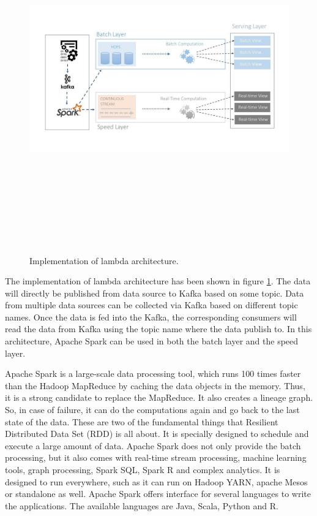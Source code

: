 \begin{figure}[htpb]
	\centering
	\includegraphics[width=17cm,height=15cm,keepaspectratio=true]{images/imp_lambda_arc}
	\caption{
		Implementation of lambda architecture.
	}
	\label{fig:impl_lambda_arc}
\end{figure}


The implementation of lambda architecture has been shown in figure \ref{fig:impl_lambda_arc}. The data will directly be published from data source to Kafka based on some topic. Data from multiple data sources can be collected via Kafka based on different topic names. Once the data is fed into the Kafka, the corresponding consumers will read the data from Kafka using the topic name where the data publish to. In this architecture, Apache Spark can be used in both the batch layer and the speed layer. 

Apache Spark is a large-scale data processing tool, which runs 100 times faster than the Hadoop MapReduce by caching the data objects in the memory. Thus, it is a strong candidate to replace the MapReduce. It also creates a lineage graph. So, in case of failure, it can do the computations again and go back to the last state of the data. These are two of the fundamental things that Resilient Distributed Data Set (RDD) is all about. It is specially designed to schedule and execute a large amount of data. Apache Spark does not only provide the batch processing, but it also comes with real-time stream processing, machine learning tools, graph processing, Spark SQL, Spark R and complex analytics. It is designed to run everywhere, such as it can run on Hadoop YARN, apache Mesos or standalone as well. Apache Spark offers interface for several languages to write the applications. The available languages are Java, Scala, Python and R.
